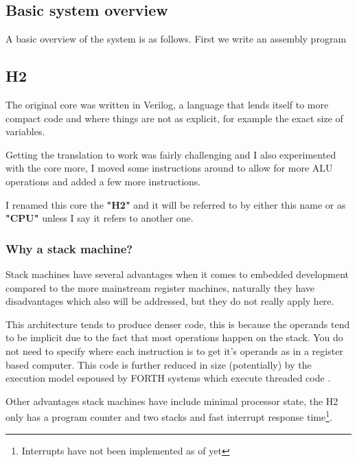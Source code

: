 \documentclass	[a4paper, 10pt]	{article}
\begin{document}
    \subsection{Basic system overview}

    A basic overview of the system is as follows. First we write an assembly program

    \subsection{H2}

    The original core was written in Verilog, a language that lends itself to more
    compact code and where things are not as explicit, for example the exact size of
    variables.

    Getting the translation to work was fairly challenging and I also experimented with
    the core more, I moved some instructions around to allow for more ALU operations
    and added a few more instructions.

    I renamed this core the \textbf{"H2"} and it will be referred to by either this name
    or as \textbf{"CPU"} unless I say it refers to another one.

    \subsubsection{Why a stack machine?}

    Stack machines have several advantages when it comes to embedded development compared
    to the more mainstream register machines, naturally they have disadvantages which also
    will be addressed, but they do not really apply here.

    This architecture tends to produce denser code\cite{newwave}, this is because the operands 
    tend to
    be implicit due to the fact that most operations happen on the stack. You do not need
    to specify where each instruction is to get it's operands as in a register based
    computer. This code is further reduced in size (potentially) by the execution model
    espoused by FORTH systems which execute threaded code \cite{threadedCode}. 

    Other advantages stack machines have include minimal processor state, the H2 only has
    a program counter and two stacks and fast interrupt response time\footnote{Interrupts
    have not been implemented as of yet}.

    

\end{document}
